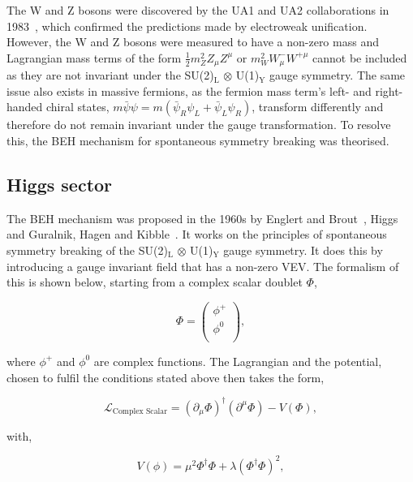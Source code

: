 The W and Z bosons were discovered by the UA1 and UA2 collaborations in 1983~\cite{UA1:1983crd,UA2:1983tsx}, which confirmed the predictions made by electroweak unification.
However, the W and Z bosons were measured to have a non-zero mass and Lagrangian mass terms of the form $\frac{1}{2}m_{Z}^2 Z_{\mu} Z^{\mu}$ or $m_{W}^2 W_{\mu}^{-}W^{+\mu}$ cannot be included as they are not invariant under the SU(2)$_{\text{L}}$ $\otimes$ U(1)$_{\text{Y}}$ gauge symmetry.
The same issue also exists in massive fermions, as the fermion mass term's left- and right-handed chiral states, $m\bar{\psi}\psi = m(\bar{\psi}_R \psi_L + \bar{\psi}_L \psi_R)$,  transform differently and therefore do not remain invariant under the gauge transformation.
To resolve this, the \ac{BEH} mechanism for spontaneous symmetry breaking was theorised.

\subsection{Higgs sector}

The \ac{BEH} mechanism was proposed in the 1960s by Englert and Brout~\cite{Englert:1964et}, Higgs~\cite{Higgs:1964ia,Higgs:1964pj,Higgs:1966ev} and Guralnik, Hagen and Kibble~\cite{Guralnik:1964eu,Kibble:1967sv}.
It works on the principles of spontaneous symmetry breaking of the SU(2)$_{\text{L}}$ $\otimes$ U(1)$_{\text{Y}}$ gauge symmetry.
It does this by introducing a gauge invariant field that has a non-zero \ac{VEV}.
The formalism of this is shown below, starting from a complex scalar doublet $\Phi$, 

\begin{equation}
	\Phi = 
	\begin{pmatrix} 
		\phi^{+} \\
		\phi^{0} \\
	\end{pmatrix},
\end{equation}

where $\phi^{+}$ and $\phi^{0}$ are complex functions.
The Lagrangian and the potential, chosen to fulfil the conditions stated above then takes the form,

\begin{equation}
	\mathcal{L}_{\text{Complex Scalar}} = (\partial_{\mu}\Phi)^{\dagger} (\partial^{\mu}\Phi) - V(\Phi),
\end{equation}

with,

\begin{equation}
V(\phi) = \mu^2 \Phi^{\dagger} \Phi + \lambda (\Phi^{\dagger} \Phi)^2,
\end{equation}


